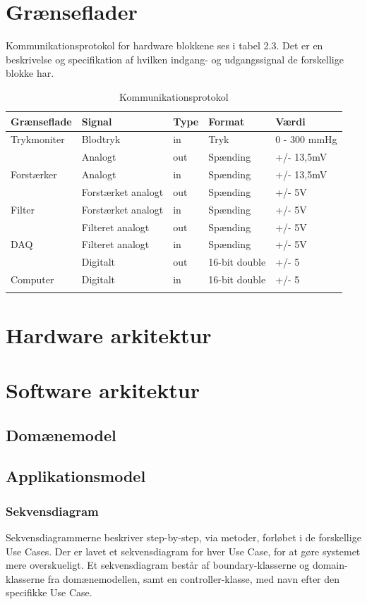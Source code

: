 \section{Grænseflader}
Kommunikationsprotokol for hardware blokkene ses i tabel 2.3. Det er en beskrivelse og specifikation af hvilken indgang- og udgangssignal de forskellige blokke har.   

\begin{longtabu} to 
	\textbf{Grænseflade} & \textbf{Signal} & \textbf{Type} & \textbf{Format} & \textbf{Værdi} \\[-1ex]
	\midrule
	Trykmoniter & Blodtryk & in & Tryk & 0 - 300 mmHg \\[-1ex]
				& Analogt & out & Spænding & +/- 13,5mV \\[-1ex]
	Forstærker  & Analogt & in & Spænding & +/- 13,5mV \\[-1ex]
				& Forstærket analogt & out & Spænding & +/- 5V \\[-1ex]
	Filter 		& Forstærket analogt & in & Spænding & +/- 5V \\				[-1ex]
				& Filteret analogt & out & Spænding & +/- 5V \\[-1ex]
	DAQ			& Filteret analogt & in & Spænding & +/- 5V \\				[-1ex]	
				& Digitalt & out & 16-bit double & +/- 5 \\[-1ex]
	Computer	& Digitalt & in & 16-bit double & +/- 5 \\[-1ex]
	\caption{Kommunikationsprotokol}	
\end{longtabu}


\section{Hardware arkitektur}


\section{Software arkitektur}

\subsection{Domænemodel}

\subsection{Applikationsmodel}

\subsubsection{Sekvensdiagram}
Sekvensdiagrammerne beskriver step-by-step, via metoder, forløbet i de forskellige Use Cases. Der er lavet et sekvensdiagram for hver Use Case, for at gøre systemet mere overskueligt. Et sekvensdiagram består af boundary-klasserne og domain-klasserne fra domænemodellen, samt en controller-klasse, med navn efter den specifikke Use Case.

